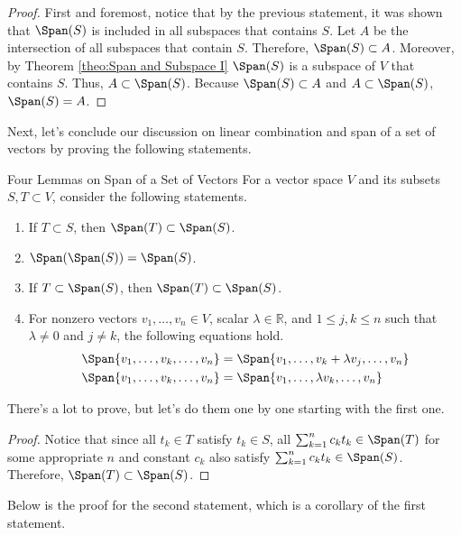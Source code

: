 \documentclass[../main.tex]{subfiles}
\begin{document}
\begin{proof}
First and foremost, notice that by the previous statement, it was
shown that $\Span(S)$ is included in all subspaces that contains $S$.
Let $A$ be the intersection of all subspaces that contain $S$.
Therefore, $\Span(S) \subset A$. Moreover, by Theorem
\ref{theo:Span and Subspace I} $\Span(S)$ is a subspace of $V$ that
contains $S$. Thus, $A \subset \Span(S)$. Because $\Span(S) \subset A$
and $A \subset \Span(S)$, $\Span(S) = A$.
\end{proof}

Next, let's conclude our discussion on linear combination and span
of a set of vectors by proving the following statements.

\begin{theorem}{Four Lemmas on Span of a Set of Vectors}
For a vector space $V$ and its subsets $S, T \subset V$, consider the
following statements.
\begin{enumerate}[noitemsep]
\item If $T \subset S$, then $\Span(T) \subset \Span(S)$.
\item $\Span(\Span(S)) = \Span(S)$.
\item If $T \subset \Span(S)$, then $\Span(T) \subset \Span(S)$.
\item For nonzero vectors $v_1, \ldots, v_n \in V$, scalar
$\lambda \in \mathbb{R}$, and $1 \leq j, k \leq n$ such that $\lambda
\neq 0$ and $j \neq k$, the following equations hold.
\vspace{-0.5\baselineskip}
\begin{align*}
    \Span\{ v_1, \ldots, v_k, \ldots, v_n \}
    &= \Span\{ v_1, \ldots, v_k + \lambda v_j, \ldots, v_n \} \\
    \Span\{ v_1, \ldots, v_k, \ldots, v_n \}
    &= \Span\{ v_1, \ldots, \lambda v_k, \ldots, v_n \}
\end{align*}
\end{enumerate}
\end{theorem}

There's a lot to prove, but let's do them one by one starting with
the first one.

\newpage
\begin{proof}
Notice that since all $t_k \in T$ satisfy $t_k \in S$, all
$\sum_{k=1}^n c_k t_k \in \Span(T)$ for some appropriate $n$ and
constant $c_k$ also satisfy $\sum_{k=1}^n c_k t_k \in \Span(S)$.
Therefore, $\Span(T) \subset \Span(S)$.
\end{proof}

Below is the proof for the second statement, which is a corollary
of the first statement.
\end{document}
